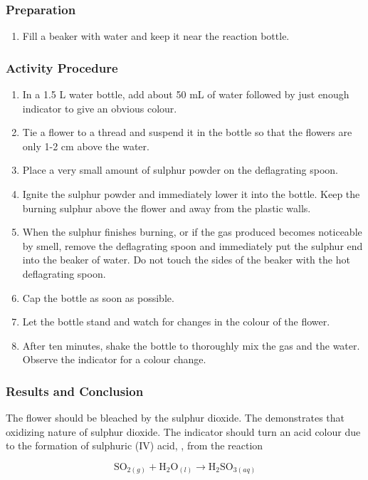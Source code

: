 \subsubsection{Preparation}
\begin{enumerate}
\item{Fill a beaker with water and keep it near the reaction bottle.}
\end{enumerate}

\subsubsection{Activity Procedure}
\begin{enumerate}
\item{In a 1.5 L water bottle, add about 50 mL of water followed by just enough indicator to give an obvious colour.}
\item{Tie a flower to a thread and suspend it in the bottle so that the flowers are only 1-2 cm above the water.}
\item{Place a very small amount of sulphur powder on the deflagrating spoon.}
\item{Ignite the sulphur powder and immediately lower it into the bottle. Keep the burning sulphur above the flower and away from the plastic walls.}
\item{When the sulphur finishes burning, or if the gas produced becomes noticeable by smell, remove the deflagrating spoon and immediately put the sulphur end into the beaker of water. Do not touch the sides of the beaker with the hot deflagrating spoon.}
\item{Cap the bottle as soon as possible.}
\item{Let the bottle stand and watch for changes in the colour of the flower.}
\item{After ten minutes, shake the bottle to thoroughly mix the gas and the water. Observe the indicator for a colour change.}
\end{enumerate}

\subsubsection{Results and Conclusion}
The flower should be bleached by the sulphur dioxide. The demonstrates that oxidizing nature of sulphur dioxide. The indicator should turn an acid colour due to the formation of sulphuric (IV) acid, , from the reaction

$$\mathrm{SO}_{2(g)} + \mathrm{H}_2\mathrm{O}_{(l)} \longrightarrow \mathrm{H}_2\mathrm{SO}_{3(aq)}$$

